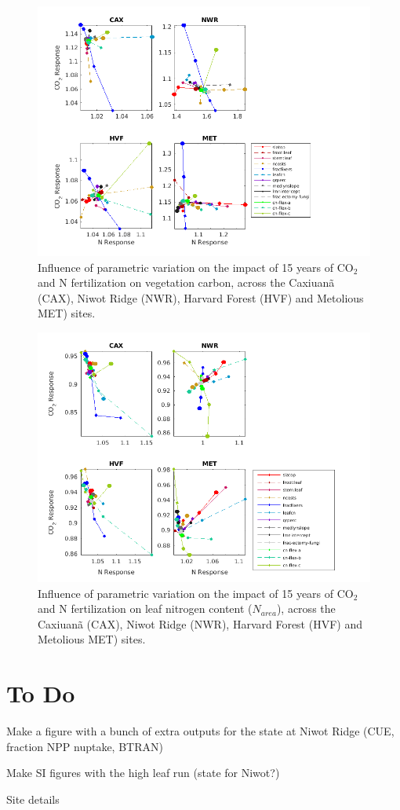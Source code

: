 \documentclass[draft,linenumbers]{agujournal}
\begin{document}
  \begin{figure}[h]
     \centering
     \includegraphics[width=1.55\textwidth, left]{matlab/figures/NOVc_CNdep_TOTVEGC1__p2012.png}
     \caption{Influence of parametric variation on the impact of 15 years of CO$_{2}$ and N fertilization on vegetation carbon, across the Caxiuan\~a (CAX), Niwot Ridge (NWR), Harvard Forest (HVF) and Metolious MET) sites.}
     \label{VEGC CO2 and N respones 2001}
  \end{figure}
  
  \begin{figure}[h]
     \centering
     \includegraphics[width=1.55\textwidth, left]{matlab/figures/NOVc_CNdep_LEAFN1__p2012.png}
     \caption{Influence of parametric variation on the impact of 15 years of CO$_{2}$ and N fertilization on leaf nitrogen content ($N_{area}$), across the Caxiuan\~a (CAX), Niwot Ridge (NWR), Harvard Forest (HVF) and Metolious MET) sites.}
     \label{Leaf N CO2 and N respones 2001}
  \end{figure}

\section{To Do}
Make a figure with a bunch of extra outputs for the state at Niwot Ridge (CUE, fraction NPP nuptake, BTRAN)

Make SI figures with the high leaf run (state for Niwot?)

Site details
\end{document}
